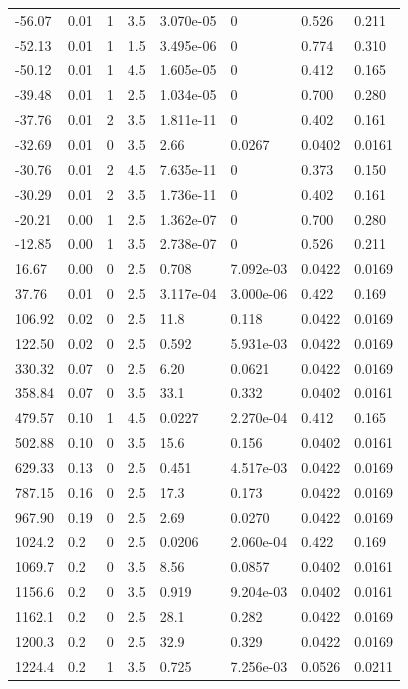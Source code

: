 \documentclass[preview]{standalone}
\begin{document}
{{\begin{tabular}{L{1.2cm}C{1.2cm} C{0.3cm}C{0.5cm} C{1.4cm}C{1.4cm} C{1.4cm}C{1.4cm}}
  -56.07  &  0.01  & 1     & 3.5 &  3.070e-05  & 0  & 0.526 &  0.211   \\ 
  -52.13  &  0.01  & 1     & 1.5 &  3.495e-06  & 0  & 0.774 &  0.310   \\ 
  -50.12  &  0.01  & 1     & 4.5 &  1.605e-05  & 0  & 0.412 &  0.165   \\ 
  -39.48  &  0.01  & 1     & 2.5 &  1.034e-05  & 0  & 0.700 &  0.280   \\ 
  -37.76  &  0.01  & 2     & 3.5 &  1.811e-11  & 0  & 0.402 &  0.161   \\ 
  -32.69  &  0.01  & 0     & 3.5 &  2.66  & 0.0267  & 0.0402 &  0.0161   \\ 
  -30.76  &  0.01  & 2     & 4.5 &  7.635e-11  & 0  & 0.373 &  0.150   \\ 
  -30.29  &  0.01  & 2     & 3.5 &  1.736e-11  & 0  & 0.402 &  0.161   \\ 
  -20.21  &  0.00  & 1     & 2.5 &  1.362e-07  & 0  & 0.700 &  0.280   \\ 
  -12.85  &  0.00  & 1     & 3.5 &  2.738e-07  & 0  & 0.526 &  0.211   \\ 
  16.67  &  0.00  & 0     & 2.5 &  0.708  & 7.092e-03  & 0.0422 &  0.0169   \\ 
  37.76  &  0.01  & 0     & 2.5 &  3.117e-04  & 3.000e-06  & 0.422 &  0.169   \\ 
  106.92  &  0.02  & 0     & 2.5 &  11.8  & 0.118  & 0.0422 &  0.0169   \\ 
  122.50  &  0.02  & 0     & 2.5 &  0.592  & 5.931e-03  & 0.0422 &  0.0169   \\ 
  330.32  &  0.07  & 0     & 2.5 &  6.20  & 0.0621  & 0.0422 &  0.0169   \\ 
  358.84  &  0.07  & 0     & 3.5 &  33.1  & 0.332  & 0.0402 &  0.0161   \\ 
  479.57  &  0.10  & 1     & 4.5 &  0.0227  & 2.270e-04  & 0.412 &  0.165   \\ 
  502.88  &  0.10  & 0     & 3.5 &  15.6  & 0.156  & 0.0402 &  0.0161   \\ 
  629.33  &  0.13  & 0     & 2.5 &  0.451  & 4.517e-03  & 0.0422 &  0.0169   \\ 
  787.15  &  0.16  & 0     & 2.5 &  17.3  & 0.173  & 0.0422 &  0.0169   \\ 
  967.90  &  0.19  & 0     & 2.5 &  2.69  & 0.0270  & 0.0422 &  0.0169   \\ 
  1024.2  &   0.2  & 0     & 2.5 &  0.0206  & 2.060e-04  & 0.422 &  0.169   \\ 
  1069.7  &   0.2  & 0     & 3.5 &  8.56  & 0.0857  & 0.0402 &  0.0161   \\ 
  1156.6  &   0.2  & 0     & 3.5 &  0.919  & 9.204e-03  & 0.0402 &  0.0161   \\ 
  1162.1  &   0.2  & 0     & 2.5 &  28.1  & 0.282  & 0.0422 &  0.0169   \\ 
  1200.3  &   0.2  & 0     & 2.5 &  32.9  & 0.329  & 0.0422 &  0.0169   \\ 
  1224.4  &   0.2  & 1     & 3.5 &  0.725  & 7.256e-03  & 0.0526 &  0.0211   \\ 
\hline 
\end{tabular} 

}}
\end{document}
